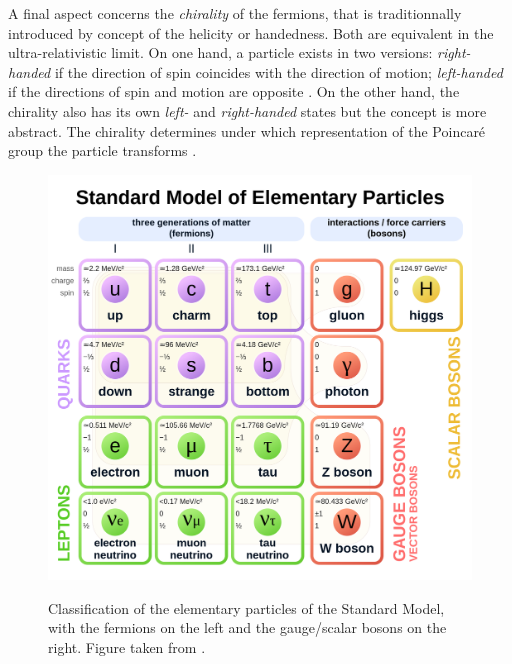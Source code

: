 \documentclass[ALICE,manyauthors]{cernphprep}
\begin{document}
A final aspect concerns the \textit{chirality} of the fermions, that is traditionnally introduced by concept of the helicity or handedness. Both are equivalent in the ultra-relativistic limit. On one hand, a particle exists in two versions: \textit{right-handed} if the direction of spin coincides with the direction of motion; \textit{left-handed} if the directions of spin and motion are opposite \cite{thomsonModernParticlePhysics2013}. On the other hand, the chirality also has its own \textit{left-} and \textit{right-handed} states but the concept is more abstract. The chirality determines under which representation of the Poincaré group the particle transforms \cite{QuantumDiaries}.\\

\begin{figure}[h]
	\centering
	\includegraphics[width=\textwidth]{Figs/Chapter2/Standard_Model_of_Elementary_Particles.svg.png}\label{fig:StdModel}
	\caption{Classification of the elementary particles of the Standard Model, with the fermions on the left and the gauge/scalar bosons on the right. Figure taken from \cite{missmjStandardModelElementary2019}.}
	\label{fig:StdModel}
\end{figure}
\end{document}
